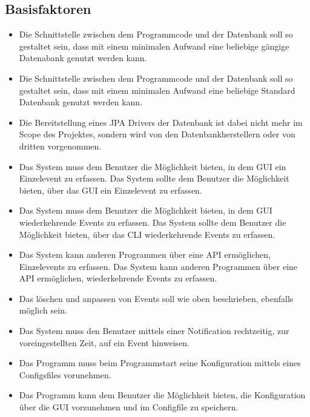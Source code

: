 \documentclass[11pt,titelpage]{scrreprt}
\begin{document}
\subsection{Basisfaktoren}
\begin{itemize}

\item Die Schnittstelle zwischen dem Programmcode und der Datenbank soll so gestaltet sein, dass mit einem minimalen Aufwand eine beliebige gängige Datenabank genutzt werden kann.

\item
Die Schnittstelle zwischen dem Programmcode und der Datenbank soll so gestaltet sein, dass mit einem minimalen Aufwand eine beliebige Standard Datenbank genutzt werden kann.

\item
Die Bereitstellung eines JPA Drivers der Datenbank ist dabei nicht mehr im Scope des Projektes, sondern wird von den Datenbankherstellern oder von dritten vorgenommen.

\item
Das System muss dem Benutzer die Möglichkeit bieten, in dem GUI ein Einzelevent zu erfassen.
Das System sollte dem Benutzer die Möglichkeit bieten, über das GUI ein Einzelevent zu erfassen.

\item
Das System muss dem Benutzer die Möglichkeit bieten, in dem GUI wiederkehrende Events zu erfassen.
Das System sollte dem Benutzer die Möglichkeit bieten, über das CLI wiederkehrende Events zu erfassen.

\item
Das System kann anderen Programmen über eine API ermöglichen, Einzelevents zu erfassen.
Das System kann anderen Programmen über eine API ermöglichen, wiederkehrende Events zu erfassen.

\item
Das löschen und anpassen von Events soll wie oben beschrieben, ebenfalls möglich sein.

\item
Das System muss den Benutzer mittels einer Notification rechtzeitig, zur voreingestellten Zeit, auf ein Event hinweisen.

\item
Das Programm muss beim Programmstart seine Konfiguration mittels eines Configsfiles vorunehmen.

\item
Das Programm kann dem Benutzer die Möglichkeit bieten, die Konfiguration über die GUI vorzunehmen und im Configfile zu speichern.


\end{itemize}
\end{document}
